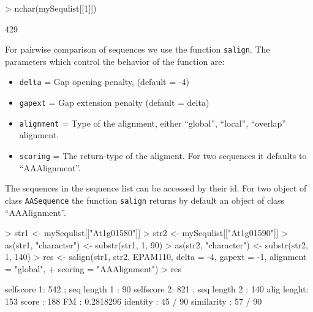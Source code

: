 \documentclass{article}
\begin{document}
\begin{Schunk}
\begin{Sinput}
> nchar(mySequlist[[1]])
\end{Sinput}
\begin{Soutput}
[1] 429
\end{Soutput}
\end{Schunk}

For pairwise comparison of sequences we use the function \texttt{salign}. The parameters which control the behavior of the function are:
\begin{itemize}
\item \texttt{delta} = Gap opening penalty, (default = -4)
\item \texttt{gapext} = Gap extension penalty (default = delta)
\item \texttt{alignment} = Type of the alignment, either ``global'', ``local'', ``overlap'' alignment.
\item \texttt{scoring} = The return-type of the aligment. For two sequences it defaults to ``AAAlignment''.
\end{itemize}


The sequences in the sequence list can be accessed by their id. For two object of class \texttt{AASequence} the function \texttt{salign} returns by default an object of class ``AAAlignment''.
\begin{Schunk}
\begin{Sinput}
> str1 <- mySequlist[["At1g01580"]]
> str2 <- mySequlist[["At1g01590"]]
> as(str1, "character") <- substr(str1, 1, 90)
> as(str2, "character") <- substr(str2, 1, 140)
> res <- salign(str1, str2, EPAM110, delta = -4, gapext = -1, alignment = "global", 
+     scoring = "AAAlignment")
> res
\end{Sinput}
\begin{Soutput}
selfscore 1:  542 ; seq length 1 : 90 
selfscore 2:  821 ; seq length 2 : 140 
alig lenght:  153 
score      :  188 
FM         :  0.2818296 
identity   :  45 / 90 
similarity :  57 / 90 
\end{Soutput}
\end{Schunk}
\end{document}
